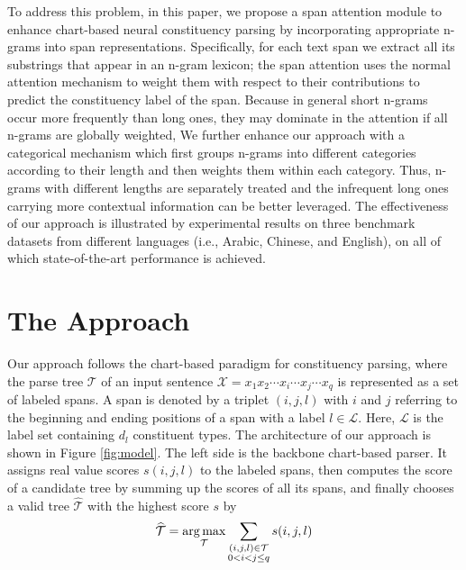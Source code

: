 \documentclass[11pt,a4paper]{article}
\begin{document}
To address this problem, in this paper, we propose a span attention module to enhance chart-based neural constituency parsing by incorporating appropriate n-grams into span representations.
Specifically, for each text span we extract all its substrings that appear in an n-gram lexicon; the span attention uses the normal attention mechanism to weight them with respect to their contributions to predict the constituency label of the span.
Because in general short n-grams occur more frequently than long ones, they may dominate in the attention if all n-grams are globally weighted,
We further enhance our approach with a categorical mechanism which first groups n-grams into different categories according to their length and then weights them within each category.
Thus, n-grams with different lengths are separately treated and the infrequent long ones carrying more contextual information can be better leveraged.
The effectiveness of our approach is illustrated by experimental results on three benchmark datasets from different languages (i.e., Arabic, Chinese, and English), on all of which state-of-the-art performance is achieved. 


\section{The Approach}


Our approach follows the chart-based paradigm for constituency parsing, where the parse tree $\mathcal{T}$ of an input sentence $\mathcal{X}=x_{1}x_{2} \cdots x_{i} \cdots x_{j} \cdots x_{q}$ is represented as a set of labeled spans. A span is denoted by a triplet $(i, j, l)$ with $i$ and $j$ referring to the beginning and ending positions of a span with a label $l \in \mathcal{L}$.
Here, $\mathcal{L}$ is the label set containing $d_{l}$ constituent types.
The architecture of our approach is shown in Figure \ref{fig:model}. The left side is the backbone chart-based parser.
It assigns real value scores $s(i, j, l)$ to the labeled spans, then computes the score of a candidate tree by summing up the scores of all its spans, and finally chooses a valid tree $\widehat{\mathcal{T}}$ with the highest score $s$ by
\begin{align}
\setlength\abovedisplayskip{5pt}
\setlength\belowdisplayskip{5pt}
    \widehat{\mathcal{T}} = \underset{\mathcal{T}}{\arg \max} \sum_{\begin{subarray}{c}(i,j,l) \in \mathcal{T} \\ 0 < i < j \leq q\end{subarray}} s(i,j,l)
\end{align}
\end{document}
